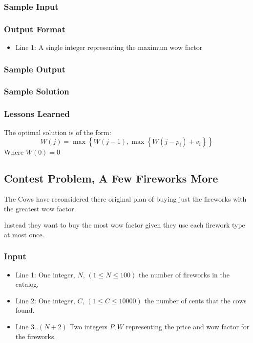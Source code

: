 \subsubsection{Sample Input}


\subsubsection{Output Format}
\begin{itemize}
	\item Line 1: A single integer representing the maximum wow factor
\end{itemize}
\subsubsection{Sample Output}


\subsubsection{Sample Solution}


\subsubsection{Lessons Learned}
The optimal solution is of the form:
$$W(j) = \max \left\{W(j-1), \max \left\{W(j - p_i) + v_i \right\}\right\}$$
Where $W(0) = 0$

\subsection{Contest Problem, A Few Fireworks More}
The Cows have reconsidered there original plan of buying just the fireworks with the greatest wow factor.

Instead they want to buy the most wow factor given they use each firework type at most once.

\subsubsection{Input}
\begin{itemize}
	\item Line 1: One integer, $N$, $(1 \leq N \leq 100)$ the number of fireworks in the catalog,
	\item Line 2: One integer, $C$, $(1 \leq C \leq 10000)$ the number of cents that the cows found.
	\item Line 3..$(N+2)$ Two integers $P,W$ representing the price and wow factor for the fireworks.
\end{itemize}

